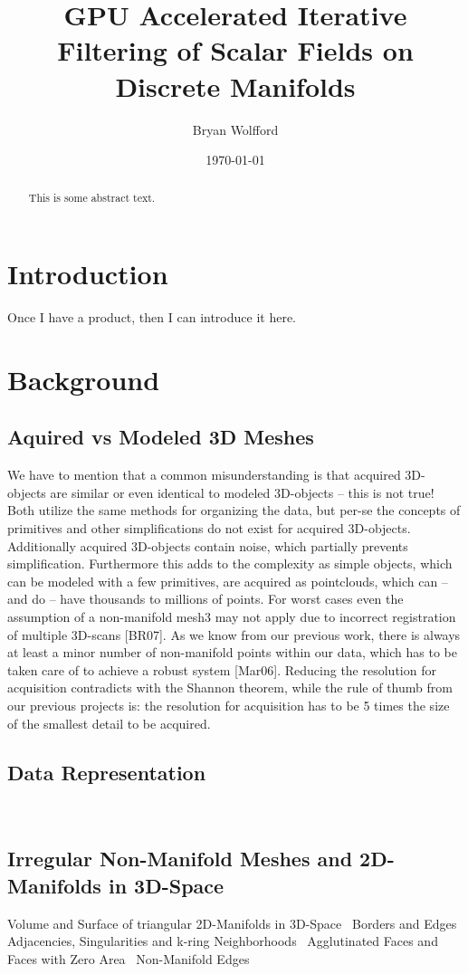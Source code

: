 \documentclass{article}
\author{Bryan Wolfford}
\title{GPU Accelerated Iterative Filtering of Scalar Fields on Discrete Manifolds}
\date{\today}
\begin{document}
\maketitle
\begin{abstract}
This is some abstract text.
\end{abstract}
\tableofcontents
\section{Introduction}
Once I have a product, then I can introduce it here.
\section{Background}
\subsection{Aquired vs Modeled 3D Meshes}
We have to mention that a common misunderstanding is that acquired 3D-objects are similar or even identical to modeled 3D-objects – this is not true! Both utilize the same methods for organizing the data, but per-se the concepts of primitives and other simplifications do not exist for acquired 3D-objects. Additionally acquired 3D-objects contain noise, which partially prevents simplification. Furthermore this adds to the complexity as simple objects, which can be modeled with a few primitives, are acquired as pointclouds, which can – and do – have thousands to millions of points. For worst cases even the assumption of a non-manifold mesh3 may not apply due to incorrect registration of multiple 3D-scans [BR07]. As we know from our previous work, there is always at least a minor number of non-manifold points within our data, which has to be taken care of to achieve a robust system [Mar06]. Reducing the resolution for acquisition contradicts with the Shannon theorem, while the rule of thumb from our previous projects is: the resolution for acquisition has to be 5 times the size of the smallest detail to be acquired.~\cite[p.~25]{Mara12}
\subsection{Data Representation}~\cite[p.~25]{Mara12}
\subsection{Irregular Non-Manifold Meshes and 2D-Manifolds in 3D-Space}
Volume and Surface of triangular 2D-Manifolds in 3D-Space~\cite[p.~27]{Mara12}
Borders and Edges~\cite[p.~28]{Mara12}
Adjacencies, Singularities and k-ring Neighborhoods~\cite[p.~29]{Mara12}
Agglutinated Faces and Faces with Zero Area~\cite[p.~32]{Mara12}
Non-Manifold Edges~\cite[p.~30]{Mara12}
\end{document}
